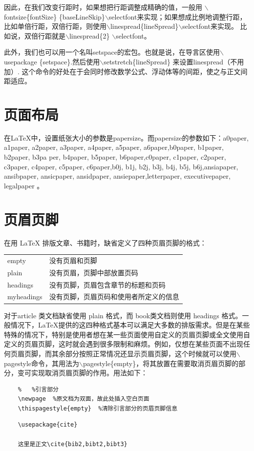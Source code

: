 \documentclass[12pt]{book}
\begin{document}
因此，在我们改变行距时，如果想把行距调整成精确的值，一般用 $\backslash$fontsize\{fontSize\} \{baseLineSkip\}$\backslash$selectfont来实现；如果想成比例地调整行距，比如单倍行距，双倍行距，则使用$\backslash$linespread\{lineSpread\}$\backslash$selectfont来实现。 比如说，双倍行距就是$\backslash$linespread\{2\} $\backslash$selectfont。

此外，我们也可以用一个名叫setspace的宏包。也就是说，在导言区使用$\backslash$usepackage \{setspace\}.然后使用$\backslash$setstretch\{lineSpread\} 来设置linespread（不用加\selectfont）. 这个命令的好处在于会同时修改数学公式、浮动体等的间距，使之与正文间距适应。

\section{页面布局}

在\LaTeX{}中，设置纸张大小的参数是papersize。而papersize的参数如下：a0paper, a1paper, a2paper, a3paper, a4paper, a5paper, a6paper,b0paper, b1paper, b2paper, b3pa per, b4paper, b5paper, b6paper,c0paper, c1paper, c2paper, c3paper, c4paper, c5paper, c6paper,b0j, b1j, b2j, b3j, b4j, b5j, b6j,ansiapaper, ansibpaper, ansicpaper, ansidpaper, ansiepaper,letterpaper, executivepaper, legalpaper 。

\section{页眉页脚}

在用 \LaTeX{} 排版文章、书籍时，缺省定义了四种页眉页脚的格式：

\begin{table}[h]
    \centering
    \begin{tabular}{ll}
        empty      & 没有页眉和页脚              \\
        plain      & 没有页眉，页脚中部放置页码        \\
        headings   & 没有页脚，页眉包含章节的标题和页码    \\
        myheadings & 没有页脚，页眉页码和使用者所定义的信息 
    \end{tabular}
\end{table}

对于article 类文档缺省使用 plain 格式，而 book类文档则使用 headings 格式。一般情况下，\LaTeX{}提供的这四种格式基本可以满足大多数的排版需求。但是在某些特殊的情况下，特别是使用者想在某一些页面使用自定义的页眉页脚或全文使用自定义的页眉页脚，这时就会遇到很多限制和麻烦。例如，仅想在某些页面不出现任何页眉页脚，而其余部分按照正常情况还显示页眉页脚，这个时候就可以使用$\backslash$pagestyle命令，其用法为$\backslash$pagestyle\{empty\}，将其放置在需要取消页眉页脚的部分，变可实现取消页眉页脚的作用。用法如下：
\begin{verbatim}
    %   %引言部分
    \newpage  %原文档为双面，故此处插入空白页面
    \thispagestyle{empty}  %清除引言部分的页眉页脚信息
\end{verbatim}
\begin{verbatim}
    \usepackage{cite}
    
    这里是正文\cite{bib2,bibt2,bibt3}
\end{verbatim}
\end{document}
